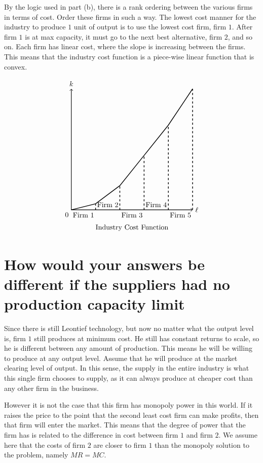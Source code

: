 \documentclass[12pt]{paper}
\begin{document}
By the logic used in part (b), there is a rank ordering between the various firms
in terms of cost. Order these firms in such a way. The lowest cost
manner for the industry to produce $1$ unit of output is to use the
lowest cost firm, firm $1$. After firm $1$ is at max capacity, it must
go to the next best alternative, firm $2$, and so on. Each firm has
linear cost, where the slope is increasing between the firms. This
means that the industry cost function is a piece-wise linear function
that is convex.


$$\begin{tikzpicture}[scale=0.6, line width = 1pt]

\draw[thick,<->] (0,10) node[above]{$k$}--(0,0)--(10,0) node[right]{$\ell$};

\node [below left] at (0,0) {$0$};

\draw (0,0)--(2,.5)--(4,2)--(6,4.5)--(8,7)--(10,10);

\draw [dashed](2,0)--(2,.5);
\node [below] at (1,0){Firm 1};
\draw [dashed](4,0)--(4,2);
\node [above] at (3,0){Firm 2};
\draw [dashed](6,0)--(6,4.5);
\node [below] at (5,0){Firm 3};
\draw [dashed](8,0)--(8,7);
\node [above] at (7,0){Firm 4};
\draw [dashed](10,0)--(10,10);
\node [below] at (9,0){Firm 5};

\node [below] at (5,-1){Industry Cost Function};

\end{tikzpicture}$$

\section*{How would your answers be different if the suppliers had no
  production capacity limit}

Since there is still Leontief technology, but now no matter what the
output level is, firm $1$ still produces at minimum cost. He still has
constant returns to scale, so he is different between any amount of
production. This means he will be willing to produce at any output
level. Assume that he will produce at the market clearing level of
output. In this sense, the supply in the entire industry is what this
single firm chooses to supply, as it can always produce at cheaper
cost than any other firm in the business.

However it is not the case that this firm has monopoly power in this
world. If it raises the price to the point that the second least cost
firm can make profits, then that firm will enter the market. This
means that the degree of power that the firm has is related to the
difference in cost between firm $1$ and firm $2$. We assume here that
the costs of firm $2$ are closer to firm $1$ than the monopoly
solution to the problem, namely $MR = MC$.
\end{document}

